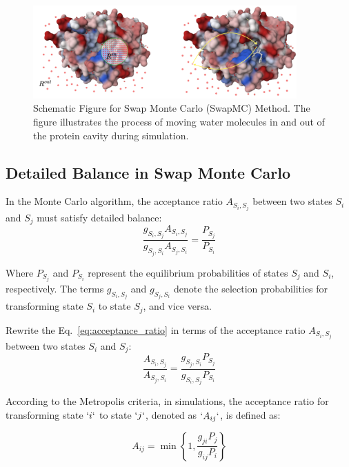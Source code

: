 \documentclass[journal=jacsat,manuscript=article]{achemso}
\begin{document}
\begin{figure}
  \includegraphics[width=0.9\textwidth]{figures/SwapMonteCarlo-scheme.png}
  \caption{Schematic Figure for Swap Monte Carlo (SwapMC) Method.
  The figure illustrates the process of moving water molecules in and out of the protein cavity during simulation.}
  \label{fig:scheme}
\end{figure}

\subsection{Detailed Balance in Swap Monte Carlo}
In the Monte Carlo algorithm, the acceptance ratio $A_{S_i, S_j}$ between two states $S_i$ and $S_j$ must satisfy detailed balance:
\begin{equation}\label{eq:acceptance_ratio}
\frac{g_{S_i,S_j} A_{S_i,S_j}}{g_{S_j,S_i} A_{S_j,S_i}}=\frac{P_{S_j}}{P_{S_i}}  
\end{equation}

Where $P_{S_j}$ and $P_{S_i}$ represent the equilibrium probabilities of states $S_j$ and $S_i$, respectively. 
The terms $g_{S_i, S_j}$ and $g_{S_j,S_i}$ denote the selection probabilities for transforming state $S_i$ to state $S_j$, and vice versa.

Rewrite the Eq.~\ref{eq:acceptance_ratio} in terms of the acceptance ratio $A_{S_i,S_j}$ between two states $S_i$ and $S_j$:
\begin{equation}\label{eq:acceptance_ratio2}
\frac{A_{S_i,S_j}}{A_{S_j,S_i}}=\frac{g_{S_j,S_i} P_{S_j}}{g_{S_i,S_j} P_{S_i}}
\end{equation}

According to the Metropolis criteria, in simulations, the acceptance ratio for transforming state $`i`$ to state $`j`$, denoted as $`A_{ij}`$, is defined as:

\begin{equation}\label{eq:acceptance_ratio3}
A_{i j}=\min \left\{1, \frac{g_{j i} P_j}{g_{i j} P_i}\right\} \tag{4}
\end{equation}
\end{document}
